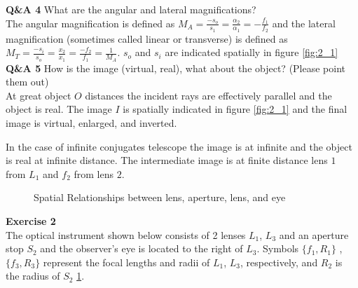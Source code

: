 \documentclass[main.tex]{subfiles}
\begin{document}
\textbf{Q\&A 4} What are the angular and lateral magnifications?\\

The angular magnification is defined as $M_A = \frac{-s_o}{s_1} = \frac{\alpha_2}{\alpha_1} = -\frac{f_1}{f_2}$ and the lateral magnification (sometimes called linear or transverse) is defined as $M_T = \frac{-s_i}{s_o} = \frac{x_2}{x_1} = \frac{-f_2}{f_1} = \frac{1}{M_A}$. $s_o$ and $s_i$ are indicated spatially in figure \ref{fig:2_1}\\

\textbf{Q\&A 5} How is the image (virtual, real), what about the object? (Please point them out)\\

At great object $O$ distances the incident rays are effectively parallel and the object is real. The image $I$ is spatially indicated in figure \ref{fig:2_1} and the final image is virtual, enlarged, and inverted. 

In the case of infinite conjugates telescope the image is at infinite and the object is real at infinite distance. The intermediate image is at finite distance lens $1$ from $L_1$ and $f_2$ from lens $2$.



\newpage

\begin{figure}
\centering{}
\caption{Spatial Relationships between lens, aperture, lens, and eye}
\label{fig:2_2}
\end{figure}

\textbf{Exercise 2}\\
The optical instrument shown below consists of 2 lenses $L_1$, $L_3$ and an aperture stop $S_2$ and the observer's eye is located to the right of $L_3$. Symbols $\{f_1 , R_1\}$ , $\{f_3 , R_3\}$ represent the focal lengths and radii of $L_1$, $L_3$, respectively, and $R_2$ is the radius of $S_2$ \ref{fig:2_2}.\\
\end{document}
